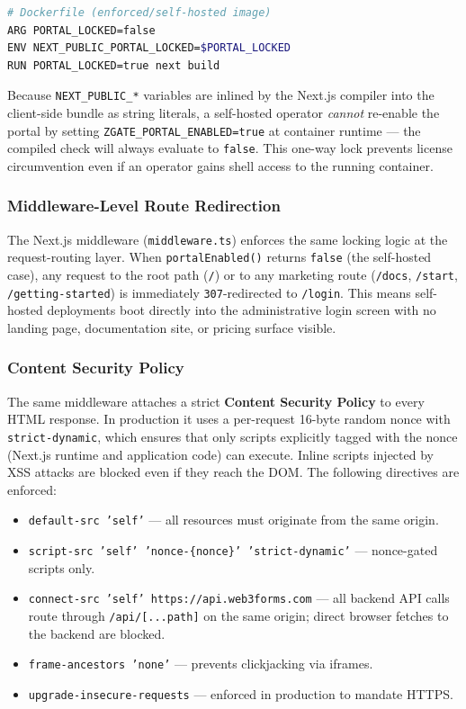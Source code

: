 \begin{lstlisting}[language=bash, caption={Hardened Docker build for self-hosted image}]
# Dockerfile (enforced/self-hosted image)
ARG PORTAL_LOCKED=false
ENV NEXT_PUBLIC_PORTAL_LOCKED=$PORTAL_LOCKED
RUN PORTAL_LOCKED=true next build
\end{lstlisting}

Because \texttt{NEXT\_PUBLIC\_*} variables are inlined by the Next.js compiler into the client-side bundle as string literals, a self-hosted operator \emph{cannot} re-enable the portal by setting \texttt{ZGATE\_PORTAL\_ENABLED=true} at container runtime --- the compiled check will always evaluate to \texttt{false}. This one-way lock prevents license circumvention even if an operator gains shell access to the running container.

\subsubsection{Middleware-Level Route Redirection}
The Next.js middleware (\texttt{middleware.ts}) enforces the same locking logic at the request-routing layer. When \texttt{portalEnabled()} returns \texttt{false} (the self-hosted case), any request to the root path (\texttt{/}) or to any marketing route (\texttt{/docs}, \texttt{/start}, \texttt{/getting-started}) is immediately \texttt{307}-redirected to \texttt{/login}. This means self-hosted deployments boot directly into the administrative login screen with no landing page, documentation site, or pricing surface visible.

\subsubsection{Content Security Policy}
The same middleware attaches a strict \textbf{Content Security Policy} to every HTML response. In production it uses a per-request 16-byte random nonce with \texttt{strict-dynamic}, which ensures that only scripts explicitly tagged with the nonce (Next.js runtime and application code) can execute. Inline scripts injected by XSS attacks are blocked even if they reach the DOM. The following directives are enforced:
\begin{itemize}
    \item \texttt{default-src 'self'} --- all resources must originate from the same origin.
    \item \texttt{script-src 'self' 'nonce-\{nonce\}' 'strict-dynamic'} --- nonce-gated scripts only.
    \item \texttt{connect-src 'self' https://api.web3forms.com} --- all backend API calls route through \texttt{/api/[...path]} on the same origin; direct browser fetches to the backend are blocked.
    \item \texttt{frame-ancestors 'none'} --- prevents clickjacking via iframes.
    \item \texttt{upgrade-insecure-requests} --- enforced in production to mandate HTTPS.
\end{itemize}


